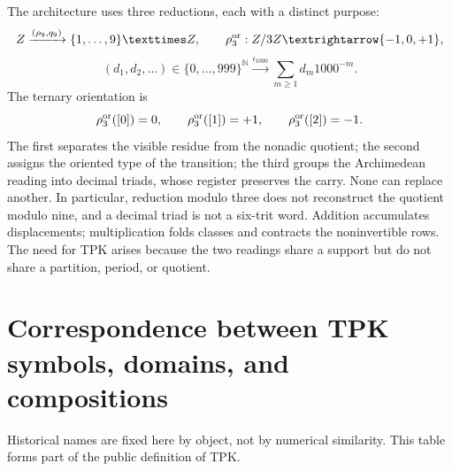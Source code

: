 The architecture uses three reductions, each with a distinct purpose:
\[
 \mathbb Z\xrightarrow{(\rho_9,q_9)}
 \{1,\ldots,9\}\times\mathbb Z,
 \qquad
 \rho_3^{\rm or}:\mathbb Z/3\mathbb Z\longrightarrow
 \{-1,0,+1\},
\]
\[
 (d_1,d_2,\ldots)\in\{0,\ldots,999\}^{\mathbb N}
 \xrightarrow{\iota_{1000}}
 \sum_{m\geq1}d_m1000^{-m}.
\]
The ternary orientation is
\[
 \rho_3^{\rm or}([0])=0,\qquad
 \rho_3^{\rm or}([1])=+1,\qquad
 \rho_3^{\rm or}([2])=-1.
\]
The first separates the visible residue from the nonadic quotient; the second assigns the oriented type of the transition; the third groups the Archimedean reading into decimal triads, whose register preserves the carry. None can replace another.
In particular, reduction modulo three does not reconstruct the quotient modulo nine, and a decimal triad is not a six-trit word.
Addition accumulates displacements; multiplication folds classes and contracts the noninvertible rows. The need for TPK arises because the two readings share a support but do not share a partition, period, or quotient.

\section{Correspondence between TPK symbols, domains, and compositions}
\label{sec:diccionario-interno-tpk}

Historical names are fixed here by object, not by numerical similarity. This
table forms part of the public definition of TPK.

